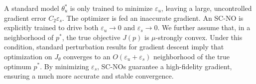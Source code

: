 A standard model $\theta_u^*$ is only trained to minimize $\varepsilon_u$, leaving a large, uncontrolled gradient error $C_2 \varepsilon_s$. The optimizer is fed an inaccurate gradient. An SC-NO is explicitly trained to drive both $\varepsilon_u \to 0$ and $\varepsilon_s \to 0$. We further assume that, in a neighborhood of $p^*$, the true objective $J(p)$ is $\mu$-strongly convex. Under this condition, standard perturbation results for gradient descent imply that optimization on $J_\theta$ converges to an $O(\varepsilon_u + \varepsilon_s)$ neighborhood of the true optimum $p^*$. By minimizing $\varepsilon_s$, SC-NOs guarantee a high-fidelity gradient, ensuring a much more accurate and stable convergence.








